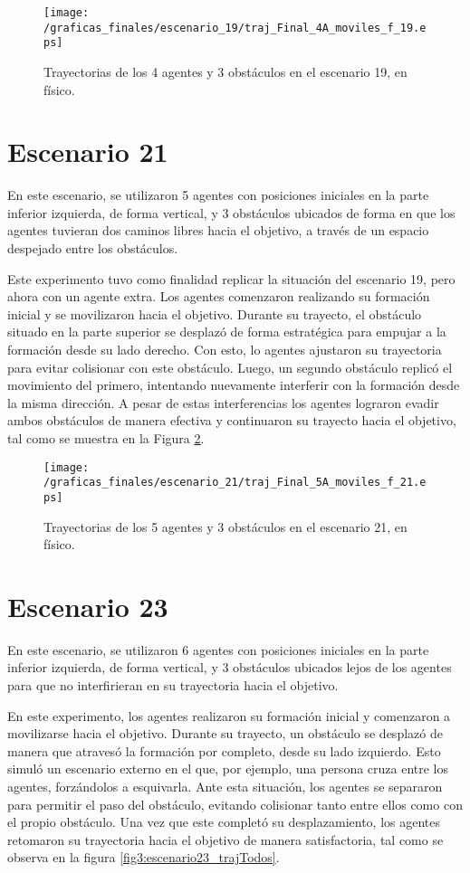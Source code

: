 \begin{figure}[H]
	\centering
	\texttt{[image: /graficas\_finales/escenario\_19/traj\_Final\_4A\_moviles\_f\_19.eps]}
	\caption{Trayectorias de los 4 agentes y 3 obstáculos en el escenario 19, en físico.}
	\label{fig3:escenario19_trajTodos}
\end{figure}

\newpage
\section{Escenario 21}
En este escenario, se utilizaron 5 agentes con posiciones iniciales en la parte inferior izquierda, de forma vertical, y 3 obstáculos ubicados de forma en que los agentes tuvieran dos caminos libres hacia el objetivo, a través de un espacio despejado entre los obstáculos.

Este experimento tuvo como finalidad replicar la situación del escenario 19, pero ahora con un agente extra. Los agentes comenzaron realizando su formación inicial y se movilizaron hacia el objetivo. Durante su trayecto, el obstáculo situado en la parte superior se desplazó de forma estratégica para empujar a la formación desde su lado derecho. Con esto, lo agentes ajustaron su trayectoria para evitar colisionar con este obstáculo. Luego, un segundo obstáculo replicó el movimiento del primero, intentando nuevamente interferir con la formación desde la misma dirección. A pesar de estas interferencias los agentes lograron evadir ambos obstáculos de manera efectiva y continuaron su trayecto hacia el objetivo, tal como se muestra en la Figura \ref{fig3:escenario21_trajTodos}. 

\begin{figure}[H]
	\centering
	\texttt{[image: /graficas\_finales/escenario\_21/traj\_Final\_5A\_moviles\_f\_21.eps]}
	\caption{Trayectorias de los 5 agentes y 3 obstáculos en el escenario 21, en físico.}
	\label{fig3:escenario21_trajTodos}
\end{figure}

\newpage
\section{Escenario 23}
En este escenario, se utilizaron 6 agentes con posiciones iniciales en la parte inferior izquierda, de forma vertical, y 3 obstáculos ubicados lejos de los agentes para que no interfirieran en su trayectoria hacia el objetivo.

En este experimento, los agentes realizaron su formación inicial y comenzaron a movilizarse hacia el objetivo. Durante su trayecto, un obstáculo se desplazó de manera que atravesó la formación por completo, desde su lado izquierdo. Esto simuló un escenario externo en el que, por ejemplo, una persona cruza entre los agentes, forzándolos a esquivarla. Ante esta situación, los agentes se separaron para permitir el paso del obstáculo, evitando colisionar tanto entre ellos como con el propio obstáculo. Una vez que este completó su desplazamiento, los agentes retomaron su trayectoria hacia el objetivo de manera satisfactoria, tal como se observa en la figura \ref{fig3:escenario23_trajTodos}. 

